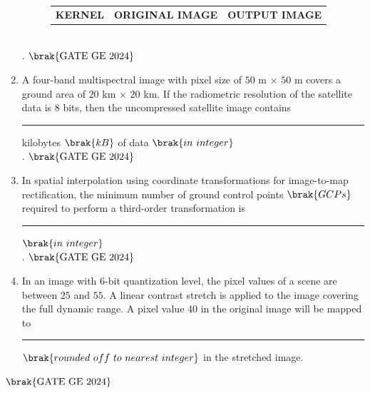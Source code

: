 \documentclass[journal,12pt,onecolumn]{IEEEtran}
\theoremstyle{remark}
\begin{document}
\begin{enumerate}
\begin{figure}[H]
    \begin{tabular}{c c c}
        \hspace{2cm}
        \textbf{KERNEL} & \hspace{1cm} \textbf{ORIGINAL IMAGE} & \hspace{1cm} \textbf{OUTPUT 
IMAGE}
    \end{tabular}
\end{figure}\\.
\hfill $\brak{\text{GATE GE 2024}}$
\bigskip
\item A four-band multispectral image with pixel size of $50$ m $\times$ $50$ m covers a ground area of $20$ km $\times$ $20$ km.
If the radiometric resolution of the satellite data is $8$ bits, then the uncompressed satellite image contains \rule{2cm}{0.5mm} kilobytes $\brak{kB}$ of data $\brak{in\ integer}$\\.
\hfill $\brak{\text{GATE GE 2024}}$
\bigskip
\item In spatial interpolation using coordinate transformations for image-to-map rectification, the minimum number of ground control points $\brak{GCPs}$ required to perform a third-order transformation is \rule{2cm}{0.5mm} $\brak{in\ integer}$\\.
\hfill $\brak{\text{GATE GE 2024}}$
\bigskip
\item In an image with $6$-bit quantization level, the pixel values of a scene are between $25$ and $55$. A linear contrast stretch is applied to the image covering the full dynamic range.
A pixel value $40$ in the original image will be mapped to \rule{2cm}{0.5mm} $\brak{rounded\ off\ to\ nearest\ integer}$ in the stretched image.
\end{enumerate}
\hfill $\brak{\text{GATE GE 2024}}$
\bigskip
\end{document}
